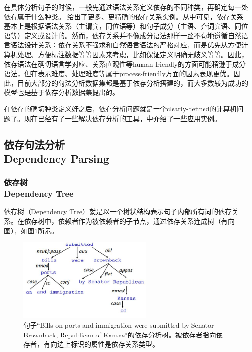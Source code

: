 在具体分析句子的时候，一般先通过语法关系定义依存的不同种类，再确定每一处依存属于什么种类。
\cite{04-blog1}给出了更多、更精确的依存关系实例。从中可见，依存关系基本上是根据语法关系（主谓宾，同位语等）和句子成分（主语、介词宾语、同位语等）定义或设计的。然而，依存关系并不像成分语法那样一丝不苟地遵循自然语言语法设计关系：依存关系不强求和自然语言语法的严格对应，而是优先从方便计算机处理、方便标注数据等等因素来考虑，比如保证定义明确无歧义等等。因此，依存语法在确切语言学对应、关系直观性等human-friendly的方面可能稍逊于成分语法，但在表示难度、处理难度等属于process-friendly方面的因素表现更优。因此，目前大部分的句法分析数据集都是基于依存分析搭建的，而大多数较为成功的模型也是基于依存分析数据集提出的。

在依存的确切种类定义好之后，依存分析问题就是一个clearly-defined的计算机问题了。现在已经有了一些解决依存分析的工具，\cite{04-blog2}中介绍了一些应用实例。

\subsection{依存句法分析 \\ Dependency Parsing}

\subsubsection{依存树 \\ Dependency Tree}

依存树（Dependency Tree）就是以一个树状结构表示句子内部所有词的依存关系。在依存树中，依赖者作为被依赖者的子节点，通过依存关系连成树（有向图），如图\ref{04-tree}所示。

\begin{figure}[!htbp]
\centering
\includegraphics[width = 0.6\textwidth]{chap-04/04-01.jpg}
\caption{句子“Bills on ports and immigration were submitted by Senator Brownback, Republican of Kansas”的依存分析树。被依存者指向依存者，有向边上标识的属性是依存关系类型。}
\label{04-tree}
\end{figure}

